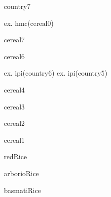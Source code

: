 \documentclass[a4paper,portrait,12pt]{article}
\begin{document}
\begin{flushleft}
country7
\end{flushleft}





\begin{flushleft}
ex. hmc(cereal0)
\end{flushleft}





\begin{flushleft}
cereal7
\end{flushleft}





\begin{flushleft}
cereal6
\end{flushleft}





\begin{flushleft}
ex. ipi(country6) ex. ipi(country5)
\end{flushleft}





\begin{flushleft}
cereal4
\end{flushleft}





\begin{flushleft}
cereal3
\end{flushleft}





\begin{flushleft}
cereal2
\end{flushleft}





\begin{flushleft}
cereal1
\end{flushleft}





\begin{flushleft}
redRice
\end{flushleft}


\begin{flushleft}
arborioRice
\end{flushleft}


\begin{flushleft}
basmatiRice
\end{flushleft}
\end{document}
